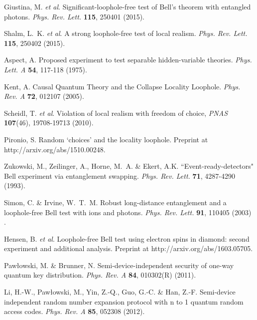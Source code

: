 \documentclass[11pt,a4paper]{article}
\begin{document}
{\begin{thebibliography}{99}
Giustina, M. {\it et al}. Significant-loophole-free test of Bell's theorem with entangled photons. \textit{Phys. Rev. Lett.} \textbf{115}, 250401 (2015). %


Shalm, L.~K. {\it et al}. A strong loophole-free test of local realism. \textit{Phys. Rev. Lett.} \textbf{115}, 250402 (2015). %

Aspect, A. Proposed experiment to test separable hidden-variable theories. \textit{Phys. Lett. A} \textbf{54}, 117-118 (1975).

 Kent, A. Causal Quantum Theory and the Collapse Locality Loophole. \textit{Phys. Rev. A} {\bf 72}, 012107 (2005).

Scheidl, T. {\em et al}.
Violation of local realism with freedom of choice, \textit{PNAS} \textbf{107}(46), 19708-19713 (2010).

Pironio, S. Random `choices' and the locality loophole. Preprint at http://arxiv.org/abs/1510.00248.

Zukowski, M., Zeilinger, A., Horne, M.~A. \& Ekert, A.K. ``Event-ready-detectors" Bell experiment via entanglement swapping. \textit{Phys. Rev. Lett.} \textbf{71}, 4287-4290 (1993).

Simon, C. \& Irvine, W.~T.~M. Robust long-distance entanglement and a loophole-free Bell test with ions and photons.
\textit{Phys. Rev. Lett.} \textbf{91}, 110405 (2003) .

Hensen,  B. {\it et al}. Loophole-free Bell test using electron spins in diamond: second experiment and additional analysis. Preprint at http://arxiv.org/abs/1603.05705.

Paw\l owski, M.  \& Brunner, N. Semi-device-independent security of one-way quantum key distribution. \textit{Phys. Rev. A} \textbf{84}, 010302(R) (2011).

Li, H.-W., Paw\l owski, M., Yin, Z.-Q., Guo, G.-C. \& Han,  Z.-F. Semi-device independent random number expansion protocol with n to 1 quantum random access codes. \textit{Phys. Rev. A} \textbf{85}, 052308 (2012).


\end{thebibliography}}
\end{document}

